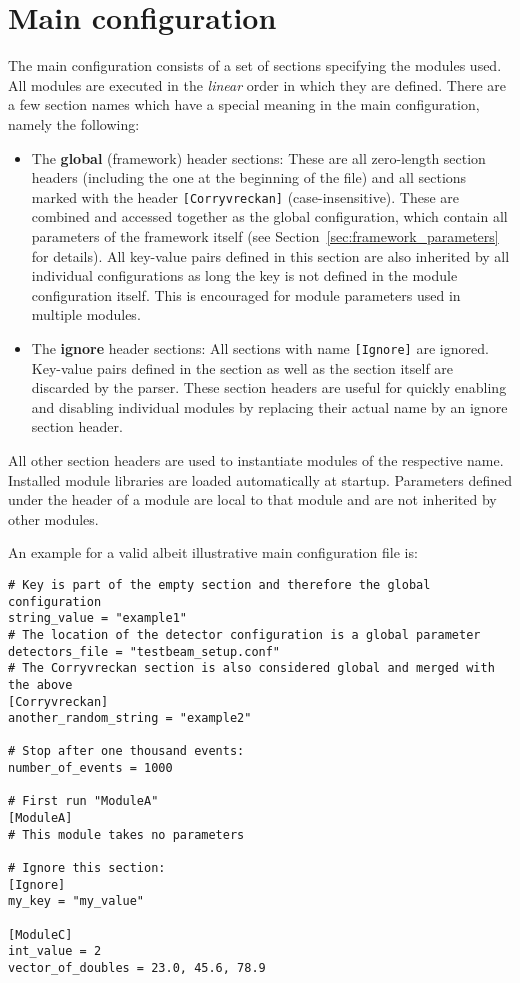 \section{Main configuration}
\label{sec:main_config}
The main configuration consists of a set of sections specifying the modules used.
All modules are executed in the \emph{linear} order in which they are defined.
There are a few section names which have a special meaning in the main configuration, namely the following:
\begin{itemize}
\item The \textbf{global} (framework) header sections: These are all zero-length section headers (including the one at the beginning of the file) and all sections marked with the header \texttt{[Corryvreckan]} (case-insensitive).
These are combined and accessed together as the global configuration, which contain all parameters of the framework itself (see Section~\ref{sec:framework_parameters} for details).
All key-value pairs defined in this section are also inherited by all individual configurations as long the key is not defined in the module configuration itself. This is encouraged for module parameters used in multiple modules.
\item The \textbf{ignore} header sections: All sections with name \texttt{[Ignore]} are ignored.
Key-value pairs defined in the section as well as the section itself are discarded by the parser.
These section headers are useful for quickly enabling and disabling individual modules by replacing their actual name by an ignore section header.
\end{itemize}

All other section headers are used to instantiate modules of the respective name.
Installed module libraries are loaded automatically at startup.
Parameters defined under the header of a module are local to that module and are not inherited by other modules.

An example for a valid albeit illustrative \corry main configuration file is:
\begin{verbatim}
# Key is part of the empty section and therefore the global configuration
string_value = "example1"
# The location of the detector configuration is a global parameter
detectors_file = "testbeam_setup.conf"
# The Corryvreckan section is also considered global and merged with the above
[Corryvreckan]
another_random_string = "example2"

# Stop after one thousand events:
number_of_events = 1000

# First run "ModuleA"
[ModuleA]
# This module takes no parameters

# Ignore this section:
[Ignore]
my_key = "my_value"

[ModuleC]
int_value = 2
vector_of_doubles = 23.0, 45.6, 78.9
\end{verbatim}

